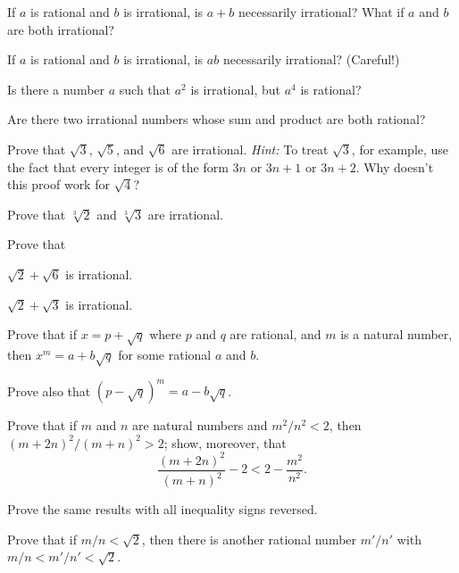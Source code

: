 \begin{letters}
\item If $a$ is rational and $b$ is irrational, is $a+b$ necessarily
  irrational? What if $a$ and $b$ are both irrational?
\item If $a$ is rational and $b$ is irrational, is $ab$ necessarily
  irrational? (Careful!)
\item Is there a number $a$ such that $a^2$ is irrational, but $a^4$ is
  rational?
\item Are there two irrational numbers whose sum and product are both
  rational?
\end{letters}

\begin{letters}
\item Prove that $\sqrt{3}$, $\sqrt{5}$, and $\sqrt{6}$ are irrational.
  \textit{Hint:} To treat $\sqrt{3}$, for example, use the fact that every
  integer is of the form $3n$ or $3n+1$ or $3n+2$. Why doesn't this proof
  work for $\sqrt{4}$?
\item Prove that $\sqrt[3]{2}$ and $\sqrt[3]{3}$ are irrational.
\end{letters}

 Prove that
\begin{letters}
\item $\sqrt{2} + \sqrt{6}$ is irrational.
\item $\sqrt{2} + \sqrt{3}$ is irrational.
\end{letters}

\begin{letters}
\item Prove that if $x = p + \sqrt{q}$ where $p$ and $q$ are rational, and
  $m$ is a natural number, then $x^m = a + b\sqrt{q}$ for some rational $a$
  and $b$.
\item Prove also that $(p - \sqrt{q})^m = a - b\sqrt{q}$.
\end{letters}

\begin{letters}
\item Prove that if $m$ and $n$ are natural numbers and $m^2/n^2 < 2$, then
  $(m+2n)^2/(m+n)^2 > 2$; show, moreover, that
\[ \frac{(m+2n)^2}{(m+n)^2} - 2 < 2 - \frac{m^2}{n^2}. \]
\item Prove the same results with all inequality signs reversed.
\item Prove that if $m/n < \sqrt{2}$, then there is another rational number
  $m'/n'$ with $m/n < m'/n' < \sqrt{2}$.
\end{letters}

